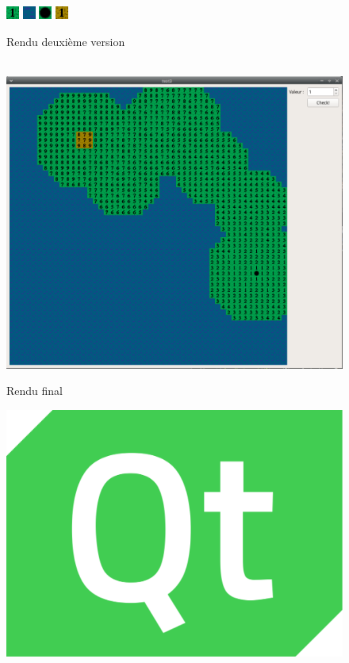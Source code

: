 \documentclass{article}
\begin{document}
\begin{figure}[!h]
\centering
\includegraphics[scale=2]{Images/green.jpg}
\includegraphics[scale=2]{Images/water.jpg}
\includegraphics[scale=2]{Images/hole.jpg}
\includegraphics[scale=2]{Images/start.jpg}
\caption{Rendu deuxième version}
~\\
\includegraphics[scale=0.5]{Images/terrain2.jpg}
\caption{Rendu final}
\end{figure}
\newpage
\begin{figure}
\centering
\includegraphics[scale=0.05]{Images/Qt_logo.png}
\end{figure}
\end{document}
